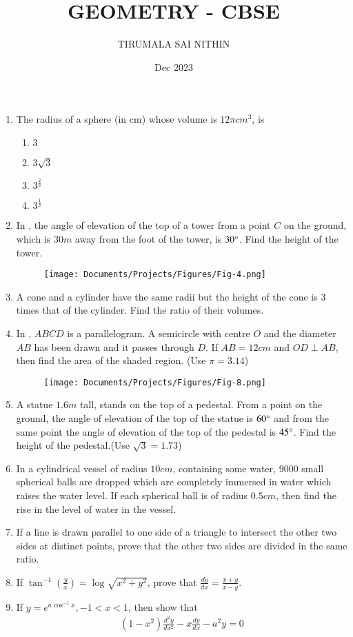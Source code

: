 \documentclass[12pt,-letter paper]{article}
\providecommand{\brak}[1]{\ensuremath{\left(#1\right)}}
\begin{document}
\title{GEOMETRY - CBSE}
\author{TIRUMALA SAI NITHIN}
\date{Dec 2023}
\maketitle
\begin{enumerate}
\item The radius of a sphere (in cm) whose volume is $12\pi cm^3$, is
\begin{enumerate}
\item $3$
\item $3 \sqrt{3}$
\item $3^\frac{2}{3}$
\item $3^\frac{1}{3}$
\end{enumerate}
\item In , the angle of elevation of the top of a tower from a point $C$ on the ground, which is $30m$ away from the foot of the tower, is $30\degree$. Find the height of the tower.      
\begin{figure}[H]
\centering
\texttt{[image: Documents/Projects/Figures/Fig-4.png]}
\caption{}      
\label{fig:Fig-4.png}
\end{figure}
\item A cone and a cylinder have the same radii but the height of the cone is $3$ times that of the cylinder. Find the ratio of their volumes.
\item In , $ABCD$ is a parallelogram. A semicircle with centre $O$ and the diameter $AB$ has been drawn and it passes through $D$. If $AB=12cm$ and $OD \perp AB$, then find the area of the shaded region. (Use $\pi=3.14$)
\begin{figure}[H]
\centering
\texttt{[image: Documents/Projects/Figures/Fig-8.png]}
\caption{}
\label{fig:Fig-8.png}
\end{figure}
\item A statue $1.6m$ tall, stands on the top of a pedestal. From a point on the ground, the angle of elevation of the top of the statue is $60\degree$ and from the same point the angle of elevation of the top of the pedestal is $45\degree$. Find the height of the pedestal.(Use $\sqrt{3}=1.73$)
\item In a cylindrical vessel of radius $10 cm$, containing some water, $9000$ small spherical balls are dropped which are completely immersed in water which raises the water level. If each spherical ball is of radius $0.5 cm$, then find the rise in the level of water in the vessel.
\item If a line is drawn parallel to one side of a triangle to intersect the other two sides at distinct points, prove that the other two sides are divided in the same ratio.
\item If $\tan^{-1}\brak{\frac{y}{x}}=\log\sqrt{x^2+y^2}$, prove that $\frac{dy}{dx}=\frac{x+y}{x-y}$.
\item If $y=e^{a \cos^{-1}x}, -1<x<1$, then show that
\begin{align}	
	\brak{1-x^2}\frac{d^2y}{dx^2}-x\frac{dy}{dx}-a^2y=0
\end{align}
\end{enumerate}
\end{document}
